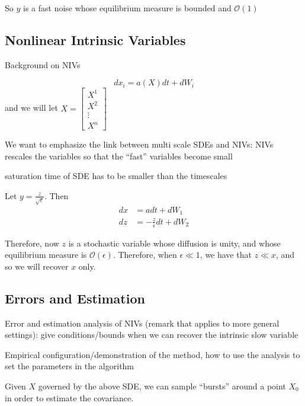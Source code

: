\documentclass[1p]{elsarticle}
\begin{document}
So $y$ is a fast noise whose equilibrium measure is bounded and $\mathcal{O}(1)$

\subsection{Nonlinear Intrinsic Variables}

Background on NIVs 	

\begin{equation}
dx_i = a(X) dt + dW_i
\end{equation}
and we will let $X = \begin{bmatrix} X^1 \\ X^2 \\ \vdots \\ X^n \end{bmatrix}$

We want to emphasize the link between multi scale SDEs and NIVs: NIVs rescales the variables so that the ``fast'' variables become small

saturation time of SDE has to be smaller than the timescales



Let $y = \frac{z}{\sqrt{\epsilon}}$. Then
\begin{equation}
\begin{aligned}
dx &= adt + dW_1\\
dz &= -\frac{z}{\epsilon} dt +  dW_2
\end{aligned}
\end{equation}

Therefore, now $z$ is a stochastic variable whose diffusion is unity, and whose equilibrium measure is $\mathcal{O}(\epsilon)$. 
%
Therefore, when $\epsilon \ll 1$, we have that $z \ll x$, and so we will recover $x$ only.


\subsection{Errors and Estimation}

Error and estimation analysis of NIVs (remark that applies to more general settings): give conditions/bounds when we can recover the intrinsic slow variable

Empirical configuration/demonstration of the method, how to use the analysis to set the parameters in the algorithm


Given $X$ governed by the above SDE, we can sample ``bursts'' around a point $X_0$ in order to estimate the covariance. 
\end{document}
